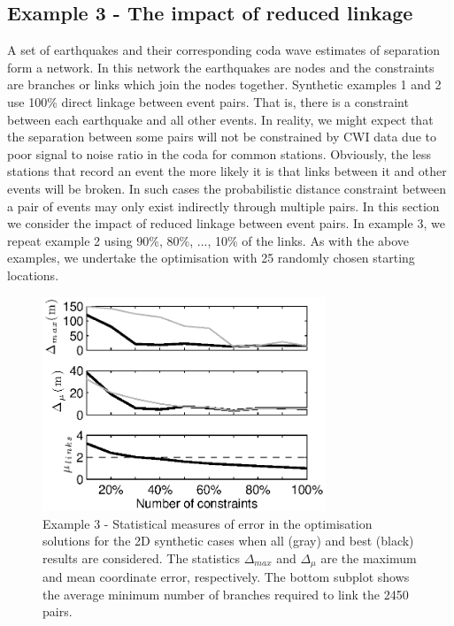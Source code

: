 \documentclass[extra, onecolumn, doublespacing]{gji}
\begin{document}
\subsection{Example 3 - The impact of reduced linkage}

A set of earthquakes and their corresponding coda wave estimates of
separation form a network. In this network the earthquakes are nodes
and the constraints are branches or links which join the nodes
together. Synthetic examples 1 and 2 use 100\% direct linkage
between event pairs. That is, there is a constraint between each
earthquake and all other events. In reality, we might expect that
the separation between some pairs will not be constrained by CWI
data due to poor signal to noise ratio in the coda for common
stations. Obviously, the less stations that record an event the more
likely it is that links between it and other events will be broken.
In such cases the probabilistic distance constraint between a pair
of events may only exist indirectly through multiple pairs. In this
section we consider the impact of reduced linkage between event
pairs. In example 3, we repeat example 2 using 90\%, 80\%, ..., 10\%
of the links. As with the above examples, we undertake the
optimisation with 25 randomly chosen starting locations.

\begin{figure}
\noindent\includegraphics[width =
20pc]{diags/synth2Dmulti/ressummary_2Dsynth50eq.eps}
\caption{Example 3 - Statistical measures of error in the
optimisation solutions for the 2D synthetic cases when all (gray)
and best (black) results are considered. The statistics
$\Delta_{max}$ and $\Delta_\mu$  are the maximum and mean coordinate
error, respectively. The bottom subplot shows the average minimum
number of branches required to link the 2450 pairs.}
 \label{fig:optimisationresults-2Dsynth}
\end{figure}
\end{document}
